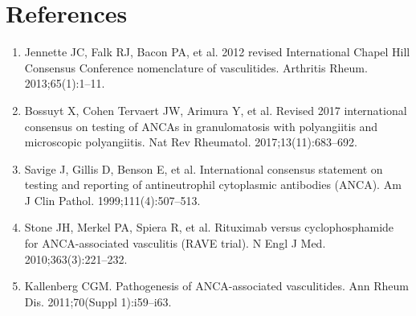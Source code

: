 \section*{References}
\begin{enumerate}
  \item Jennette JC, Falk RJ, Bacon PA, et al. 2012 revised International Chapel Hill Consensus Conference nomenclature of vasculitides. Arthritis Rheum. 2013;65(1):1--11.
  \item Bossuyt X, Cohen Tervaert JW, Arimura Y, et al. Revised 2017 international consensus on testing of ANCAs in granulomatosis with polyangiitis and microscopic polyangiitis. Nat Rev Rheumatol. 2017;13(11):683--692.
  \item Savige J, Gillis D, Benson E, et al. International consensus statement on testing and reporting of antineutrophil cytoplasmic antibodies (ANCA). Am J Clin Pathol. 1999;111(4):507--513.
  \item Stone JH, Merkel PA, Spiera R, et al. Rituximab versus cyclophosphamide for ANCA-associated vasculitis (RAVE trial). N Engl J Med. 2010;363(3):221--232.
  \item Kallenberg CGM. Pathogenesis of ANCA-associated vasculitides. Ann Rheum Dis. 2011;70(Suppl 1):i59--i63.
\end{enumerate}

\clearpage
